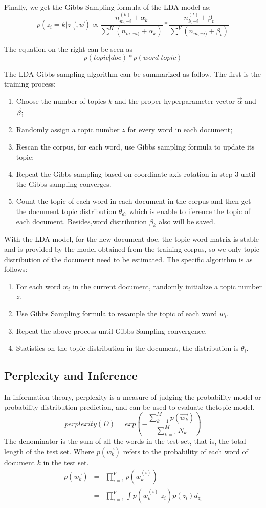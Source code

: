 Finally, we get the Gibbs Sampling formula of the LDA model as:
\[
p(z_i=k|\vec{z_{\neg_i}},\vec{w}) \propto \frac{n_{m,\neg{i}}^{(k)}+\alpha_k}{\sum^K (n_{m,\neg{i})}+\alpha_k)} *
 \frac{n_{k,\neg{i}}^{(t)}+\beta_t}{\sum^V (n_{m,\neg{i})}+\beta_t)}
\]


The equation on the right can be seen as \[
  p(topic|doc)*p(word|topic)
\]


The LDA Gibbs sampling algorithm can be summarized as follow. The first is the training process:
\begin{enumerate}
  \item  Choose the  number of topics $k$ and the proper hyperparameter vector $\vec{\alpha}$ and $\vec{\beta}$;
　\item Randomly assign a topic number $z$ for every word in each document;
　\item Rescan the corpus, for each word, use Gibbs sampling formula to update its topic;
  \item Repeat the Gibbs sampling based on coordinate axis rotation in step 3 until the Gibbs sampling converges.
  \item Count the topic of each word in each document in the corpus and then get the document topic distribution $\theta_d$, which is enable to iference the topic of each document. Besides,word distribution $\beta_k$ also will be saved.
\end{enumerate}

With the LDA model, for the new document doc, the topic-word matrix is stable and is provided by the model obtained from the training corpus, so we only topic distribution of the document need to be estimated. The specific algorithm is as follows:
\begin{enumerate}
  \item  For each word $w_i$ in the current document, randomly initialize a topic number $z$.
  \item Use Gibbs Sampling formula to resample the topic of each word $w_i$.
  \item  Repeat the above process until Gibbs Sampling convergence.
  \item Statistics on the topic distribution in the document, the distribution is $\theta_i$.
\end{enumerate}

\subsection{Perplexity and Inference}

In information theory, perplexity\cite{per} is a measure of judging the probability model or probability distribution prediction, and can be used to evaluate thetopic model.
\[
  perplexity(D) = exp(-\frac{\sum_{k=1}^{M}p(\vec{w_k})}{\sum_{k=1}^{M}N_k})
\]
The denominator is the sum of all the words in the test set, that is, the total length of the test set. Where $p(\vec{w_k})$ refers to the probability of each word of document $k$ in the test set.
\begin{eqnarray*}
  p(\vec{w_k}) &=&\prod_{i=1}^{V}p(w_k^{(i)})\\
               &=&\prod_{i=1}^{V}\int p(w_k^{(i)}|z_i)p(z_i)d_{z_i}
\end{eqnarray*}
